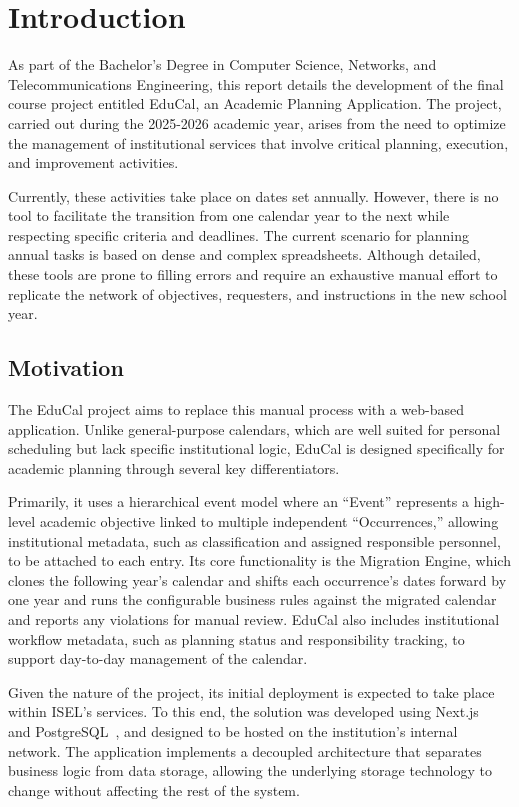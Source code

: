 %
%
\chapter{Introduction} \label{cap:intro}

As part of the Bachelor's Degree in Computer Science, Networks, and Telecommunications Engineering, this report details the development of the final course project entitled EduCal, an Academic Planning Application. The project, carried out during the 2025-2026 academic year, arises from the need to optimize the management of institutional services that involve critical planning, execution, and improvement activities.

Currently, these activities take place on dates set annually. However, there is no tool to facilitate the transition from one calendar year to the next while respecting specific criteria and deadlines. The current scenario for planning annual tasks is based on dense and complex spreadsheets. Although detailed, these tools are prone to filling errors and require an exhaustive manual effort to replicate the network of objectives, requesters, and instructions in the new school year.

\section{Motivation} \label{sec:motivation}

The EduCal project aims to replace this manual process with a web-based application. Unlike general-purpose calendars, which are well suited for personal scheduling but lack specific institutional logic, EduCal is designed specifically for academic planning through several key differentiators.

Primarily, it uses a hierarchical event model where an ``Event'' represents a high-level academic objective linked to multiple independent ``Occurrences,'' allowing institutional metadata, such as classification and assigned responsible personnel, to be attached to each entry. Its core functionality is the Migration Engine, which clones the following year's calendar and shifts each occurrence's dates forward by one year and runs the configurable business rules against the migrated calendar and reports any violations for manual review. EduCal also includes institutional workflow metadata, such as planning status and responsibility tracking, to support day-to-day management of the calendar.

Given the nature of the project, its initial deployment is expected to take place within ISEL's services. To this end, the solution was developed using Next.js~\cite{nextjs} and PostgreSQL~\cite{postgresql}, and designed to be hosted on the institution's internal network. The application implements a decoupled architecture that separates business logic from data storage, allowing the underlying storage technology to change without affecting the rest of the system.

